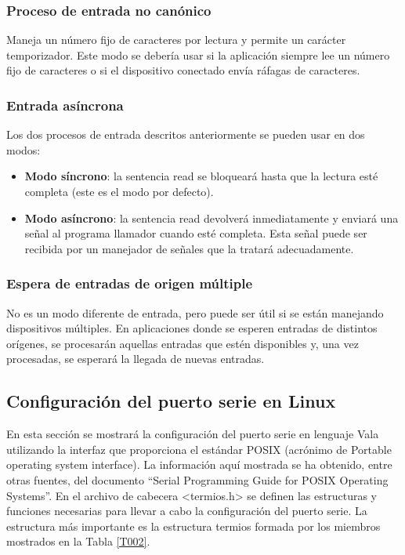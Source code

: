 \documentclass[12pt,twoside]{book}
\begin{document}
\subsubsection{Proceso de entrada no canónico}

Maneja un número fijo de caracteres por lectura y permite un carácter
temporizador. Este modo se debería usar si la aplicación siempre lee un número
fijo de caracteres o si el dispositivo conectado envía ráfagas de caracteres.


\subsubsection{Entrada asíncrona}


Los dos procesos de entrada descritos anteriormente se pueden usar en dos
modos:

\begin{itemize}
\item \textbf{Modo síncrono}: la sentencia read se bloqueará hasta que la lectura esté
completa (este es el modo por defecto).

\item \textbf{Modo asíncrono}: la sentencia read devolverá inmediatamente y enviará
una señal al programa llamador cuando esté completa. Esta señal puede
ser recibida por un manejador de señales que la tratará adecuadamente.
\end{itemize}

\subsubsection{Espera de entradas de origen múltiple}

No es un modo diferente de entrada, pero puede ser útil si se están manejando
dispositivos múltiples. En aplicaciones donde se esperen entradas de distintos
orígenes, se procesarán aquellas entradas que estén disponibles y, una vez
procesadas, se esperará la llegada de nuevas entradas.

\subsection{Configuración del puerto serie en Linux}

En esta sección se mostrará la configuración del puerto serie en lenguaje Vala
utilizando la interfaz que proporciona el estándar POSIX (acrónimo de Portable
operating system interface). La información aquí mostrada se ha obtenido, entre
otras fuentes, del documento ``Serial Programming Guide for POSIX Operating
Systems''.
En el archivo de cabecera <termios.h> se definen las estructuras y funciones
necesarias para llevar a cabo la configuración del puerto serie. La estructura más
importante es la estructura termios formada por los miembros mostrados en la
Tabla \ref{T002}.
\end{document}
